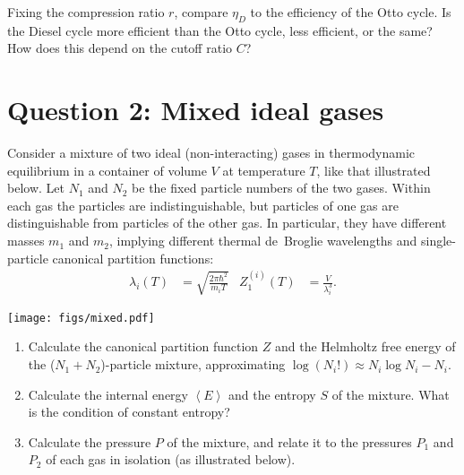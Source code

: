 \documentclass[12 pt]{article} %
\newcommand{\la}{\ensuremath{\lambda} }
\newcommand{\vev}[1]{\ensuremath{\left\langle #1 \right\rangle} }
\newcommand{\showmarks}[1]{\rightline{\texttt{[#1 marks]}}} %
\begin{document}
\showmarks{10}

Fixing the compression ratio $r$, compare $\eta_D$ to the efficiency of the Otto cycle.
Is the Diesel cycle more efficient than the Otto cycle, less efficient, or the same?
How does this depend on the cutoff ratio $C$?

\showmarks{4}



\newpage
\section*{Question 2: Mixed ideal gases}
Consider a mixture of two ideal (non-interacting) gases in thermodynamic equilibrium in a container of volume $V$ at temperature $T$, like that illustrated below.
Let $N_1$ and $N_2$ be the fixed particle numbers of the two gases.
Within each gas the particles are indistinguishable, but particles of one gas are distinguishable from particles of the other gas.
In particular, they have different masses $m_1$ and $m_2$, implying different thermal de~Broglie wavelengths and single-particle canonical partition functions:
\begin{align*}
  \la_i(T) & = \sqrt{\frac{2\pi\hbar^2}{m_i T}} &
  Z_1^{(i)}(T) & = \frac{V}{\la_i^3}.
\end{align*}

\begin{center}\texttt{[image: figs/mixed.pdf]}\end{center}

\begin{enumerate}[label={(\alph*)}]
  \item Calculate the canonical partition function $Z$ and the Helmholtz free energy of the ($N_1 + N_2$)-particle mixture, approximating $\log(N_i!) \approx N_i\log N_i - N_i$.

  \showmarks{4}

  \item Calculate the internal energy $\vev{E}$ and the entropy $S$ of the mixture.
        What is the condition of constant entropy?

  \showmarks{4}

  \item Calculate the pressure $P$ of the mixture, and relate it to the pressures $P_1$ and $P_2$ of each gas in isolation (as illustrated below).

  \showmarks{4}
\end{enumerate}
\end{document}
